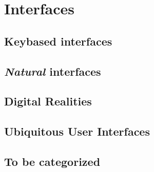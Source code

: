 \section{Interfaces}


\subsection{Keybased interfaces}






\subsection{\emph{Natural} interfaces}






\subsection{Digital Realities}




\subsection{Ubiquitous User Interfaces}  




\subsection{To be categorized}
\todo







